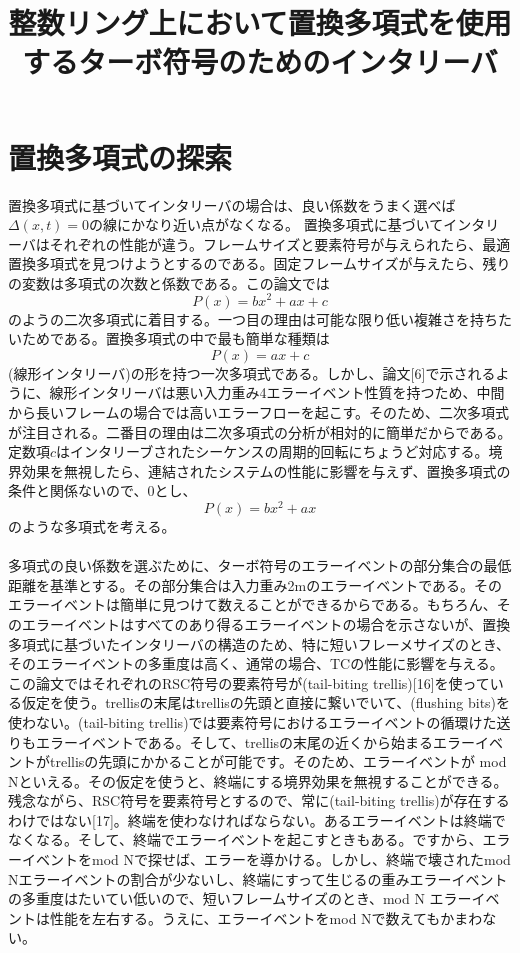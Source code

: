 \documentclass[20 pts]{article}
\title{整数リング上において置換多項式を使用するターボ符号のためのインタリーバ}
\date{}
\begin{document}
\maketitle

\section{置換多項式の探索}
置換多項式に基づいてインタリーバの場合は、良い係数をうまく選べば$\Delta(x,t)=0$の線にかなり近い点がなくなる。
置換多項式に基づいてインタリーバはそれぞれの性能が違う。フレームサイズと要素符号が与えられたら、最適置換多項式を見つけようとするのである。固定フレームサイズが与えたら、残りの変数は多項式の次数と係数である。この論文では$$P(x)= bx^2+ax+c$$のようの二次多項式に着目する。一つ目の理由は可能な限り低い複雑さを持ちたいためである。置換多項式の中で最も簡単な種類は$$P(x)=ax+c$$(線形インタリーバ)の形を持つ一次多項式である。しかし、論文[6]で示されるように、線形インタリーバは悪い入力重み4エラーイベント性質を持つため、中間から長いフレームの場合では高いエラーフローを起こす。そのため、二次多項式が注目される。二番目の理由は二次多項式の分析が相対的に簡単だからである。
定数項$c$はインタリーブされたシーケンスの周期的回転にちょうど対応する。境界効果を無視したら、連結されたシステムの性能に影響を与えず、置換多項式の条件と関係ないので、$0$とし、
$$P(x)= bx^2+ax$$のような多項式を考える。

\paragraph{}
多項式の良い係数を選ぶために、ターボ符号のエラーイベントの部分集合の最低距離を基準とする。その部分集合は入力重み2mのエラーイベントである。そのエラーイベントは簡単に見つけて数えることができるからである。もちろん、そのエラーイベントはすべてのあり得るエラーイベントの場合を示さないが、置換多項式に基づいたインタリーバの構造のため、特に短いフレーメサイズのとき、そのエラーイベントの多重度は高く、通常の場合、TCの性能に影響を与える。
この論文ではそれぞれのRSC符号の要素符号が(tail-biting trellis)[16]を使っている仮定を使う。trellisの末尾はtrellisの先頭と直接に繋いでいて、(flushing bits)を使わない。(tail-biting trellis)では要素符号におけるエラーイベントの循環けた送りもエラーイベントである。そして、trellisの末尾の近くから始まるエラーイベントがtrellisの先頭にかかることが可能です。そのため、エラーイベントが mod Nといえる。その仮定を使うと、終端にする境界効果を無視することができる。残念ながら、RSC符号を要素符号とするので、常に(tail-biting trellis)が存在するわけではない[17]。終端を使わなければならない。あるエラーイベントは終端でなくなる。そして、終端でエラーイベントを起こすときもある。ですから、エラーイベントをmod Nで探せば、エラーを導かける。しかし、終端で壊されたmod Nエラーイベントの割合が少ないし、終端にすって生じるの重みエラーイベントの多重度はたいてい低いので、短いフレームサイズのとき、mod N エラーイベントは性能を左右する。うえに、エラーイベントをmod Nで数えてもかまわない。　
\end{document}
